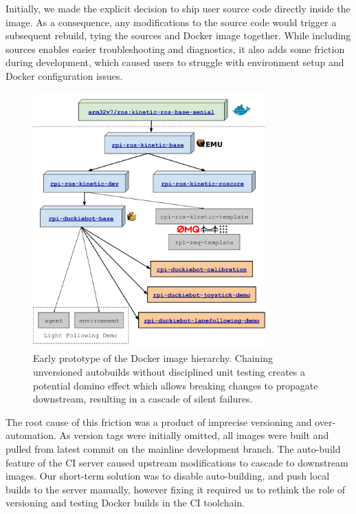 \documentclass[12pt,initial,twoside,maitrise]{dms}
\numberwithin{equation}{section}
\numberwithin{table}{chapter}
\numberwithin{figure}{chapter}
\begin{document}
Initially, we made the explicit decision to ship user source code directly inside the image. As a consequence, any modifications to the source code would trigger a subsequent rebuild, tying the sources and Docker image together. While including sources enables easier troubleshooting and diagnostics, it also adds some friction during development, which caused users to struggle with environment setup and Docker configuration issues.

\begin{figure}
\includegraphics[width=0.80\textwidth]{../figures/image_provenance.png}
\caption{Early prototype of the Docker image hierarchy. Chaining unversioned autobuilds without disciplined unit testing creates a potential domino effect which allows breaking changes to propagate downstream, resulting in a cascade of silent failures.}
    \label{fig:early_prototype}
\end{figure}

The root cause of this friction was a product of imprecise versioning and over-automation. As version tags were initially omitted, all images were built and pulled from latest commit on the mainline development branch. The auto-build feature of the CI server caused upstream modifications to cascade to downstream images. Our short-term solution was to disable auto-building, and push local builds to the server manually, however fixing it required us to rethink the role of versioning and testing Docker builds in the CI toolchain.
\end{document}
